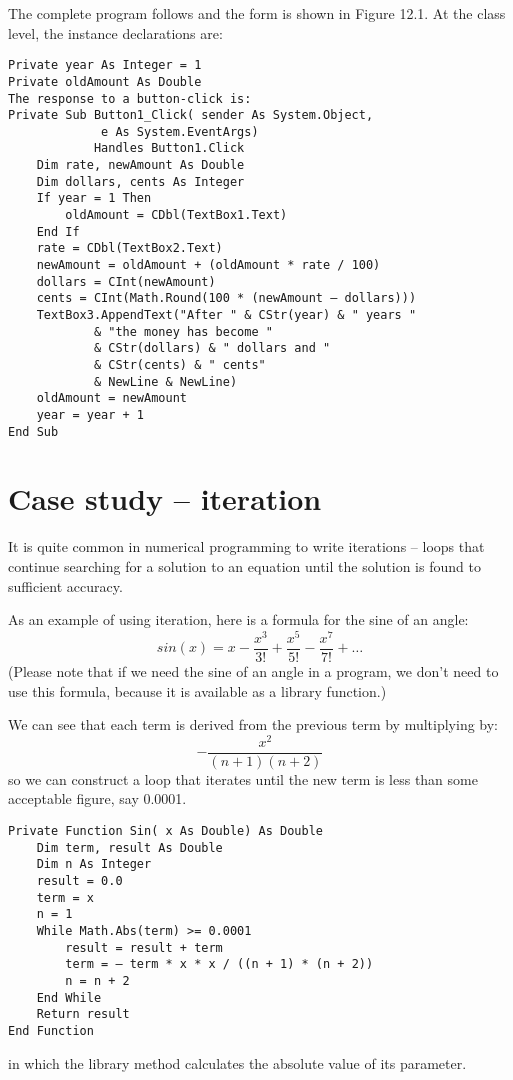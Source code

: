 		The complete program follows and the form is shown in Figure 12.1. At the class level, the instance declarations are:
		\begin{lstlisting}
Private year As Integer = 1
Private oldAmount As Double
The response to a button-click is:
Private Sub Button1_Click( sender As System.Object,
			 e As System.EventArgs)
			Handles Button1.Click
	Dim rate, newAmount As Double
	Dim dollars, cents As Integer
	If year = 1 Then
		oldAmount = CDbl(TextBox1.Text)
	End If
	rate = CDbl(TextBox2.Text)
	newAmount = oldAmount + (oldAmount * rate / 100)
	dollars = CInt(newAmount)
	cents = CInt(Math.Round(100 * (newAmount – dollars)))
	TextBox3.AppendText("After " & CStr(year) & " years "
			& "the money has become "
			& CStr(dollars) & " dollars and "
			& CStr(cents) & " cents"
			& NewLine & NewLine)
	oldAmount = newAmount
	year = year + 1
End Sub
		\end{lstlisting}

		
	\section{Case study – iteration}
		It is quite common in numerical programming to write iterations – loops that continue searching for a solution to an equation until the solution is found to sufficient accuracy.
		
		As an example of using iteration, here is a formula for the sine of an angle:
		\begin{equation*}
			sin(x) = x - \frac{x^3}{3!} + \frac{x^5}{5!} - \frac{x^7}{7!} + …
		\end{equation*}
		(Please note that if we need the sine of an angle in a program, we don't need to use this formula, because it is available as a library function.)
		
		We can see that each term is derived from the previous term by multiplying by:
		\begin{equation*}
			-\frac{x^2}{(n + 1)(n + 2)}
		\end{equation*}
		so we can construct a loop that iterates until the new term is less than some acceptable figure, say 0.0001.
		\begin{lstlisting}
Private Function Sin( x As Double) As Double
	Dim term, result As Double
	Dim n As Integer
	result = 0.0
	term = x
	n = 1
	While Math.Abs(term) >= 0.0001
		result = result + term
		term = – term * x * x / ((n + 1) * (n + 2))
		n = n + 2
	End While
	Return result
End Function
		\end{lstlisting}
		in which the library method  calculates the absolute value of its parameter.


